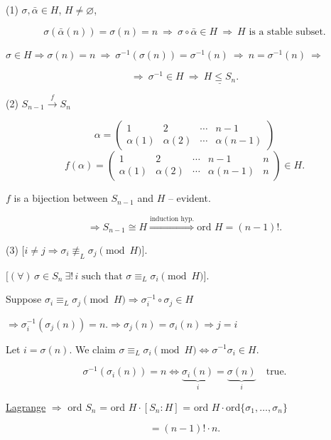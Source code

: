 \bigskip
\noindent (1) $\sigma,\bar\alpha\in H$, $H\neq\varnothing$,

\[
\sigma(\bar\alpha(n))=\sigma(n)=n \ \Rightarrow \ \sigma\circ\bar\alpha\in H \ \Rightarrow \ H \text{ is a stable subset.}
\]

\noindent $\sigma\in H \Rightarrow \sigma(n)=n \ \Rightarrow \ \sigma^{-1}(\sigma(n))=\sigma^{-1}(n) \ \Rightarrow \ n=\sigma^{-1}(n) \ \Rightarrow$

\[
\Rightarrow \ \sigma^{-1}\in H \ \Rightarrow \ \underline{H\leq S_n}.
\]

\bigskip
\noindent (2) \quad $S_{n-1} \xrightarrow{\ f\ } S_n$

\[
\alpha = \begin{pmatrix} 1 & 2 & \cdots & n-1 \\ \alpha(1) & \alpha(2) & \cdots & \alpha(n-1) \end{pmatrix}
\]
\[
f(\alpha) = \begin{pmatrix} 1 & 2 & \cdots & n-1 & n \\ \alpha(1) & \alpha(2) & \cdots & \alpha(n-1) & n \end{pmatrix} \in H.
\]

\noindent $f$ is a bijection between $S_{n-1}$ and $H$ -- evident.

\[
\Rightarrow S_{n-1}\cong H \overset{\text{induction hyp.}}{\Longrightarrow} \text{ord } H=(n-1)!.
\]

\bigskip
\noindent (3) \quad $\big[i\neq j \Rightarrow \sigma_i \not\equiv_L \sigma_j \pmod H\big]$.

\noindent $\big[(\forall)\, \sigma\in S_n \ \exists!\, i \text{ such that } \sigma\equiv_L \sigma_i \pmod H\big]$.

\bigskip
\noindent Suppose $\sigma_i\equiv_L\sigma_j \pmod H \Rightarrow \sigma_i^{-1}\circ\sigma_j\in H$

\noindent $\Rightarrow \sigma_i^{-1}(\sigma_j(n))=n. \Rightarrow \sigma_j(n)=\sigma_i(n) \Rightarrow j=i$

\bigskip
\noindent Let $i=\sigma(n)$. We claim $\sigma\equiv_L\sigma_i \pmod H \Leftrightarrow \sigma^{-1}\sigma_i\in H$.

\[
\sigma^{-1}(\sigma_i(n))=n \Leftrightarrow \underbrace{\sigma_i(n)}_{i} = \underbrace{\sigma(n)}_{i} \quad \text{true.}
\]

\bigskip
\noindent\underline{Lagrange} $\Rightarrow$ ord $S_n$ = ord $H\cdot[S_n:H]$ = ord $H\cdot$ord$\{\sigma_1,\ldots,\sigma_n\}$

\[
= (n-1)!\cdot n.
\]



